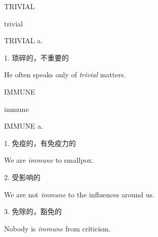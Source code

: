 \begin{flashcard}{
TRIVIAL

trivial
}
\begin{center}
TRIVIAL a. 
\end{center}
1. 琐碎的，不重要的

He often speaks only of \textit{trivial} matters.

\end{flashcard}
\begin{flashcard}{
IMMUNE

immune
}
\begin{center}
IMMUNE a. 
\end{center}
1. 免疫的，有免疫力的

We are \textit{immune} to smallpox.

2. 受影响的

We are not \textit{immune} to the influences around us.

3. 免除的，豁免的

Nobody is \textit{immune} from criticism.

\end{flashcard}
